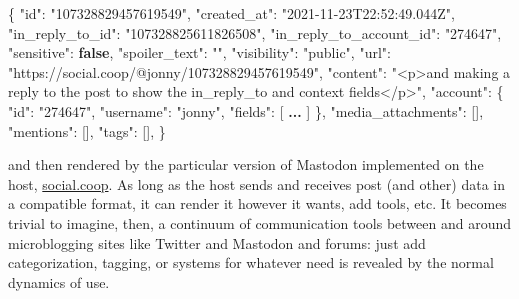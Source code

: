 \documentclass[10pt]{article}
\newenvironment{Shaded}{}{}
\newcommand{\DataTypeTok}[1]{\textcolor[rgb]{0.56,0.13,0.00}{#1}}
\newcommand{\ErrorTok}[1]{\textcolor[rgb]{1.00,0.00,0.00}{\textbf{#1}}}
\newcommand{\FunctionTok}[1]{\textcolor[rgb]{0.02,0.16,0.49}{#1}}
\newcommand{\KeywordTok}[1]{\textcolor[rgb]{0.00,0.44,0.13}{\textbf{#1}}}
\newcommand{\OtherTok}[1]{\textcolor[rgb]{0.00,0.44,0.13}{#1}}
\newcommand{\StringTok}[1]{\textcolor[rgb]{0.25,0.44,0.63}{#1}}
\begin{document}
\begin{multicols}{2}
\begin{Shaded}
\begin{Highlighting}[]
\FunctionTok{\{}
    \DataTypeTok{"id"}\FunctionTok{:} \StringTok{"107328829457619549"}\FunctionTok{,}
    \DataTypeTok{"created\_at"}\FunctionTok{:} \StringTok{"2021{-}11{-}23T22:52:49.044Z"}\FunctionTok{,}
    \DataTypeTok{"in\_reply\_to\_id"}\FunctionTok{:} \StringTok{"107328825611826508"}\FunctionTok{,}
    \DataTypeTok{"in\_reply\_to\_account\_id"}\FunctionTok{:} \StringTok{"274647"}\FunctionTok{,}
    \DataTypeTok{"sensitive"}\FunctionTok{:} \KeywordTok{false}\FunctionTok{,}
    \DataTypeTok{"spoiler\_text"}\FunctionTok{:} \StringTok{""}\FunctionTok{,}
    \DataTypeTok{"visibility"}\FunctionTok{:} \StringTok{"public"}\FunctionTok{,}
    \DataTypeTok{"url"}\FunctionTok{:} \StringTok{"https://social.coop/@jonny/107328829457619549"}\FunctionTok{,}
    \DataTypeTok{"content"}\FunctionTok{:} \StringTok{"\textless{}p\textgreater{}and making a reply to the post to show the in\_reply\_to and context fields\textless{}/p\textgreater{}"}\FunctionTok{,}
    \DataTypeTok{"account"}\FunctionTok{:}
    \FunctionTok{\{}
        \DataTypeTok{"id"}\FunctionTok{:} \StringTok{"274647"}\FunctionTok{,}
        \DataTypeTok{"username"}\FunctionTok{:} \StringTok{"jonny"}\FunctionTok{,}
        \DataTypeTok{"fields"}\FunctionTok{:}
        \OtherTok{[} \ErrorTok{...} \OtherTok{]}
    \FunctionTok{\},}
    \DataTypeTok{"media\_attachments"}\FunctionTok{:} \OtherTok{[]}\FunctionTok{,}
    \DataTypeTok{"mentions"}\FunctionTok{:} \OtherTok{[]}\FunctionTok{,}
    \DataTypeTok{"tags"}\FunctionTok{:} \OtherTok{[]}\FunctionTok{,}
\FunctionTok{\}}
\end{Highlighting}
\end{Shaded}

and then rendered by the particular version of Mastodon implemented on
the host, \href{https://social.coop}{social.coop}. As long as the host
sends and receives post (and other) data in a compatible format, it can
render it however it wants, add tools, etc. It becomes trivial to
imagine, then, a continuum of communication tools between and around
microblogging sites like Twitter and Mastodon and forums: just add
categorization, tagging, or systems for whatever need is revealed by the
normal dynamics of use.


\end{multicols}
\end{document}
